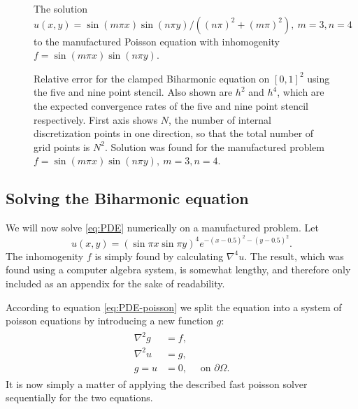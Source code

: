 \begin{figure}[tb]
  \centering
  \caption{The solution $u(x, y) = \sin(m \pi x)\sin(n \pi y) / ((n\pi)^2 + (m\pi)^2), ~m=3, n=4$ to the manufactured Poisson equation with inhomogenity $f=\sin(m \pi x)\sin(n \pi y)$.}
  \label{fig:pde:order_solution}
\end{figure}

\begin{figure}[tb]
  \centering 
  \caption{Relative error for the clamped Biharmonic equation on $[0,1]^2$ using the five and nine point stencil.
    Also shown are $h^2$ and $h^4$, which are the expected convergence rates of the five and nine point stencil respectively.
    First axis shows $N$, the number of internal discretization points in one direction, so that the total number of grid points is $N^2$.
    Solution was found for the manufactured problem $f=\sin(m \pi x)\sin(n\pi y), ~m = 3, n=4$.
  }
  \label{fig:pde:order}
\end{figure}


\subsection{Solving the Biharmonic equation}
\label{sec:pde:solving}
We will now solve \eqref{eq:PDE} numerically on a manufactured problem.
Let
$$
u(x, y) =
\left(
\sin \pi x
\sin \pi y
\right)^4
e^{-(x-0.5)^2 - (y-0.5)^2}.
$$
The inhomogenity $f$ is simply found by calculating $\nabla^4 u$.
The result, which was found using a computer algebra system, is somewhat lengthy, and therefore only included as an appendix for the sake of readability.



According to equation \eqref{eq:PDE-poisson} we split the equation into a system of poisson equations by introducing a new function $g$:
\begin{align*}
  \begin{split}
    \nabla^2g &= f,\\
    \nabla^2u &= g,\\
    g = u &= 0,\quad \text{ on } \partial \Omega.
  \end{split}
\end{align*}
It is now simply a matter of applying the described fast poisson solver sequentially for the two equations.

